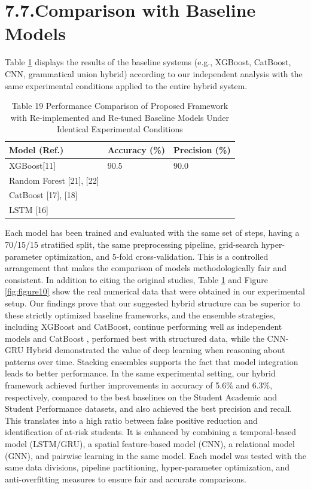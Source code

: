 \documentclass[twocolumn]{svjour3}
\begin{document}
\section{7.7.Comparison with Baseline Models}
Table \ref{tab:table19} displays the results of the baseline systems (e.g., XGBoost, CatBoost, CNN, grammatical union hybrid) according to our independent analysis with the same experimental conditions applied to the entire hybrid system.
\begin{table}
\centering
\caption{Table 19 Performance Comparison of Proposed Framework with Re-implemented and Re-tuned Baseline Models Under Identical Experimental Conditions}
\label{tab:table19}
\begin{tabular}{lll}
\hline
Model (Ref.) & Accuracy (\%) & Precision (\%) \\
\hline
XGBoost[11] & 90.5 & 90.0 \\
Random Forest [21], [22] & & \\
CatBoost [17], [18] & & \\
LSTM [16] & & \\
\hline
\end{tabular}
\end{table}
Each model has been trained and evaluated with the same set of steps, having a 70/15/15 stratified split, the same preprocessing pipeline, grid-search hyper-parameter optimization, and 5-fold cross-validation. This is a controlled arrangement that makes the comparison of models methodologically fair and consistent. In addition to citing the original studies, Table \ref{tab:table19} and Figure \ref{fig:figure10} show the real numerical data that were obtained in our experimental setup.
Our findings prove that our suggested hybrid structure can be superior to these strictly optimized baseline frameworks, and the ensemble strategies, including XGBoost and CatBoost, continue performing well as independent models \cite{ref1} and CatBoost \cite{ref2} \cite{ref3}, performed best with structured data, while the CNN-GRU Hybrid \cite{ref4} demonstrated the value of deep learning when reasoning about patterns over time. Stacking ensembles \cite{ref5} supports the fact that model integration leads to better performance.
In the same experimental setting, our hybrid framework achieved further improvements in accuracy of 5.6\% and 6.3\%, respectively, compared to the best baselines on the Student Academic and Student Performance datasets, and also achieved the best precision and recall. This translates into a high ratio between false positive reduction and identification of at-risk students. It is enhanced by combining a temporal-based model (LSTM/GRU), a spatial feature-based model (CNN), a relational model (GNN), and pairwise learning in the same model. Each model was tested with the same data divisions, pipeline partitioning, hyper-parameter optimization, and anti-overfitting measures to ensure fair and accurate comparisons.
\end{document}

